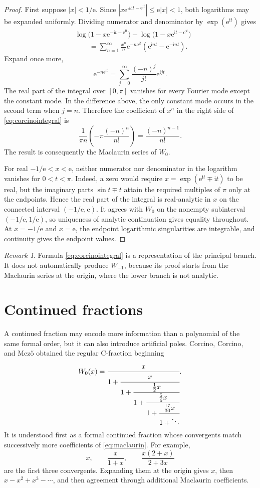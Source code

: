 \documentclass[11pt,openany]{book}
\newcommand{\e}{\mathrm{e}}
\newcommand{\ii}{\mathrm{i}}
\newcommand{\abs}[1]{\left|#1\right|}
\theoremstyle{plain}
\theoremstyle{definition}
\theoremstyle{remark}
\newtheorem{remark}[theorem]{Remark}
\begin{document}
\begin{proof}
First suppose \(\abs x<1/\e\).  Since
\(\abs{x\e^{\pm\ii t-\e^{\ii t}}}\le\e\abs x<1\), both logarithms may be
expanded uniformly.  Dividing numerator and denominator by
\(\exp(\e^{\ii t})\) gives
\begin{align*}
 &\log\bigl(1-x\e^{-\ii t-\e^{\ii t}}\bigr)
 -\log\bigl(1-x\e^{\ii t-\e^{\ii t}}\bigr)\\
 &\qquad=\sum_{n=1}^{\infty}\frac{x^n}{n}
   \e^{-n\e^{\ii t}}
   \left(\e^{\ii nt}-\e^{-\ii nt}\right).
\end{align*}
Expand once more,
\[
       \e^{-n\e^{\ii t}}
       =\sum_{j=0}^{\infty}\frac{(-n)^j}{j!}\e^{\ii jt}.
\]
The real part of the integral over \([0,\pi]\) vanishes for every Fourier
mode except the constant mode.  In the difference above, the only constant
mode occurs in the second term when \(j=n\).  Therefore the coefficient of
\(x^n\) in the right side of \eqref{eq:corcinointegral} is
\[
 \frac1{\pi n}\left(-\pi\frac{(-n)^n}{n!}\right)
 =\frac{(-n)^{n-1}}{n!}.
\]
The result is consequently the Maclaurin series of \(W_0\).

For real \(-1/\e<x<\e\), neither numerator nor denominator in the logarithm
vanishes for \(0<t<\pi\).  Indeed, a zero would require
\(x=\exp(\e^{\ii t}\mp\ii t)\) to be real, but the imaginary parts
\(\sin t\mp t\) attain the required multiples of \(\pi\) only at the
endpoints.  Hence the real part of the integral is real-analytic in \(x\) on
the connected interval \((-1/\e,\e)\).  It agrees with \(W_0\) on the
nonempty subinterval \((-1/\e,1/\e)\), so uniqueness of analytic
continuation gives equality throughout.  At \(x=-1/\e\) and \(x=\e\), the
endpoint logarithmic singularities are integrable, and continuity gives the
endpoint values.
\end{proof}

\begin{remark}
Formula \eqref{eq:corcinointegral} is a representation of the principal
branch.  It does not automatically produce \(W_{-1}\), because its proof
starts from the Maclaurin series at the origin, where the lower branch is not
analytic.
\end{remark}

\section{Continued fractions}
A continued fraction may encode more information than a polynomial of the same
formal order, but it can also introduce artificial poles.  Corcino, Corcino,
and Mez\H{o} obtained the regular C-fraction beginning
\begin{equation}\label{eq:Cfraction}
 W_0(x)=
 \cfrac{x}{1+
  \cfrac{x}{1+
   \cfrac{\frac12x}{1+
    \cfrac{\frac56x}{1+
     \cfrac{\frac{17}{30}x}{1+\ddots}}}}}.
\end{equation}
It is understood first as a formal continued fraction whose convergents match
successively more coefficients of \eqref{eq:maclaurin}.  For example,
\[
        x,
        \qquad
        \frac{x}{1+x},
        \qquad
        \frac{x(2+x)}{2+3x}
\]
are the first three convergents.  Expanding them at the origin gives
\(x\), then \(x-x^2+x^3-\cdots\), and then agreement through additional
Maclaurin coefficients.
\end{document}
